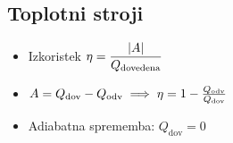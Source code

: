 \subsection{Toplotni stroji}
\begin{itemize}
    \item Izkoristek \(\displaystyle \eta = \frac{|A|}{Q_\text{dovedena}}\)
    \item \(A = Q_\text{dov} - Q_\text{odv} \implies \eta = 1 - \frac{Q_\text{odv}}{Q_\text{dov}}\)
    \item Adiabatna sprememba: \(Q_\text{dov} = 0\)
\end{itemize}


